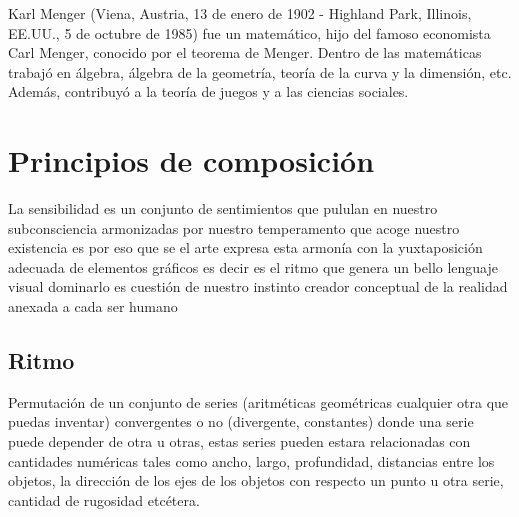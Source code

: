 \documentclass[a4paper]{book}
\begin{document}
Karl Menger (Viena, Austria, 13 de enero de 1902 - Highland Park, Illinois, EE.UU., 5 de octubre de 1985) fue un matemático, hijo del famoso economista Carl Menger, conocido por el teorema de Menger. Dentro de las matemáticas trabajó en álgebra, álgebra de la geometría, teoría de la curva y la dimensión, etc. Además, contribuyó a la teoría de juegos y a las ciencias sociales.



\chapter{Principios de composición}

La sensibilidad es un conjunto de sentimientos que pululan en nuestro subconsciencia armonizadas por nuestro temperamento que acoge nuestro existencia es por eso que se el arte expresa esta armonía con la yuxtaposición adecuada de elementos gráficos es decir es el ritmo que genera un bello lenguaje visual dominarlo es cuestión de nuestro instinto creador conceptual de la realidad anexada a cada ser humano


\section{Ritmo}


Permutación de un conjunto de series (aritméticas geométricas cualquier otra que puedas inventar) convergentes o no (divergente, constantes) donde una serie puede depender de otra u otras, estas series pueden estara relacionadas con cantidades numéricas tales como ancho, largo, profundidad, distancias entre los objetos, la dirección de los ejes de los objetos con respecto un punto u otra serie, cantidad de rugosidad etcétera.
\end{document}
